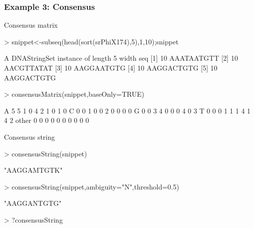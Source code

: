 \documentclass{beamer}
\begin{document}
\begin{frame}[fragile]
\frametitle{Example 3: Consensus}
  \bit
      \item Consensus matrix
           \begin{uncoverenv}
\begin{Schunk}
\begin{Sinput}
> snippet<-subseq(head(sort(srPhiX174),5),1,10);snippet
\end{Sinput}
\begin{Soutput}
  A DNAStringSet instance of length 5
    width seq
[1]    10 AAATAATGTT
[2]    10 AACGTTATAT
[3]    10 AAGGAATGTG
[4]    10 AAGGACTGTG
[5]    10 AAGGACTGTG
\end{Soutput}
\begin{Sinput}
> consensusMatrix(snippet,baseOnly=TRUE)
\end{Sinput}
\begin{Soutput}
      [,1] [,2] [,3] [,4] [,5] [,6] [,7] [,8] [,9] [,10]
A        5    5    1    0    4    2    1    0    1     0
C        0    0    1    0    0    2    0    0    0     0
G        0    0    3    4    0    0    0    4    0     3
T        0    0    0    1    1    1    4    1    4     2
other    0    0    0    0    0    0    0    0    0     0
\end{Soutput}
\end{Schunk}
            \end{uncoverenv}
      \item Consensus string
           \begin{uncoverenv}
\begin{Schunk}
\begin{Sinput}
> consensusString(snippet)
\end{Sinput}
\begin{Soutput}
[1] "AAGGAMTGTK"
\end{Soutput}
\begin{Sinput}
> consensusString(snippet,ambiguity="N",threshold=0.5)
\end{Sinput}
\begin{Soutput}
[1] "AAGGANTGTG"
\end{Soutput}
\begin{Sinput}
> ?consensusString
\end{Sinput}
\end{Schunk}
          \end{uncoverenv}
  \eit
\end{frame}

\end{document}
